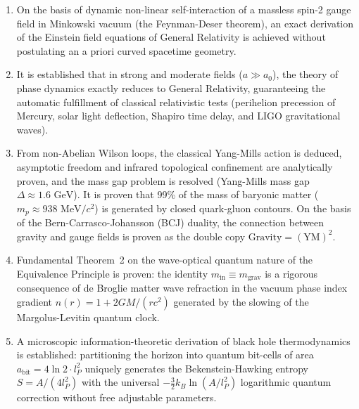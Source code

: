 \documentclass[11pt,a4paper]{article}
\theoremstyle{definition}
\begin{document}
\begin{enumerate}
\item On the basis of dynamic non-linear self-interaction of a massless spin-2 gauge field in Minkowski vacuum (the Feynman-Deser theorem), an exact derivation of the Einstein field equations of General Relativity is achieved without postulating an a priori curved spacetime geometry.
\item It is established that in strong and moderate fields ($a \gg a_0$), the theory of phase dynamics exactly reduces to General Relativity, guaranteeing the automatic fulfillment of classical relativistic tests (perihelion precession of Mercury, solar light deflection, Shapiro time delay, and LIGO gravitational waves).
\item From non-Abelian Wilson loops, the classical Yang-Mills action is deduced, asymptotic freedom and infrared topological confinement are analytically proven, and the mass gap problem is resolved (Yang-Mills mass gap $\Delta \approx 1.6\text{ GeV}$). It is proven that 99\% of the mass of baryonic matter ($m_p \approx 938\text{ MeV}/c^2$) is generated by closed quark-gluon contours. On the basis of the Bern-Carrasco-Johansson (BCJ) duality, the connection between gravity and gauge fields is proven as the double copy $\text{Gravity} = (\text{YM})^2$.
\item Fundamental Theorem~2 on the wave-optical quantum nature of the Equivalence Principle is proven: the identity $m_{\text{in}} \equiv m_{\text{grav}}$ is a rigorous consequence of de Broglie matter wave refraction in the vacuum phase index gradient $n(r) = 1 + 2GM/(rc^2)$ generated by the slowing of the Margolus-Levitin quantum clock.
\item A microscopic information-theoretic derivation of black hole thermodynamics is established: partitioning the horizon into quantum bit-cells of area $a_{\text{bit}} = 4\ln 2 \cdot l_P^2$ uniquely generates the Bekenstein-Hawking entropy $S = A / (4 l_P^2)$ with the universal $- \frac{3}{2} k_B \ln(A/l_P^2)$ logarithmic quantum correction without free adjustable parameters.
\end{enumerate}

\end{document}

